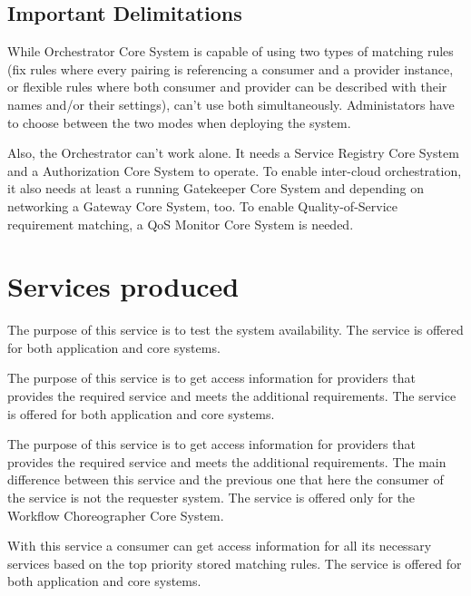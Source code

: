 \documentclass[a4paper]{arrowhead}
\begin{document}
\subsection{Important Delimitations}
\label{sec:delimitations}

While Orchestrator Core System is capable of using two types of matching rules (fix rules where every pairing is referencing a consumer and a provider instance, or flexible rules where both consumer and provider can be described with their names and/or their settings), can't use both simultaneously. Administators have to choose between the two modes when deploying the system.

Also, the Orchestrator can't work alone. It needs a Service Registry Core System and a Authorization Core System to operate. To enable inter-cloud orchestration, it also needs at least a running Gatekeeper Core System and depending on networking a Gateway Core System, too. To enable Quality-of-Service requirement matching, a QoS Monitor Core System is needed.

\newpage

\section{Services produced}
\label{sec:services}

The purpose of this service is to test the system availability. The service is offered for both application and core systems. 

The purpose of this service is to get access information for providers that provides the required service and meets the additional requirements. The service is offered for both application and core systems. 

The purpose of this service is to get access information for providers that provides the required service and meets the additional requirements. The main difference between this service and the previous one that here the consumer of the service is not the requester system. The service is offered only for the Workflow Choreographer Core System. 

With this service a consumer can get access information for all its necessary services based on the top priority stored matching rules. The service is offered for both application and core systems.
\end{document}
